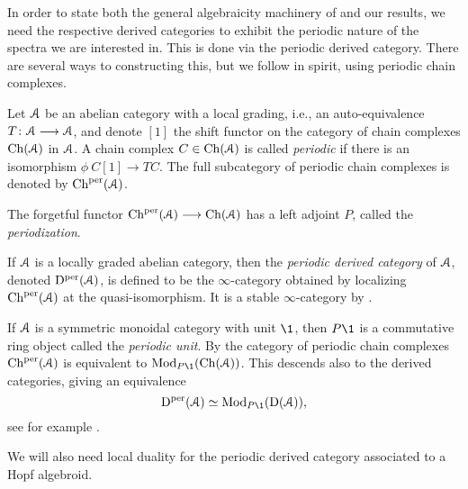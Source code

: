 In order to state both the general algebraicity machinery of \cite{patchkoria-pstragowski_2021} and our results, we need the respective derived categories to exhibit the periodic nature of the spectra we are interested in. This is done via the periodic derived category. There are several ways to constructing this, but we follow \cite{franke_96} in spirit, using periodic chain complexes. 

\begin{definition}
    \label{ch1:def:periodic-chain-complex}
    Let $\EuScript{A}$ be an abelian category with a local grading, i.e., an auto-equivalence $T\colon \EuScript{A}\longrightarrow\EuScript{A}$, and denote $[1]$ the shift functor on the category of chain complexes $\mathrm{Ch}(\EuScript{A})$ in $\EuScript{A}$. A chain complex $C\in \mathrm{Ch}(\EuScript{A})$ is called \emph{periodic} if there is an isomorphism $\phi\: C[1]\longrightarrow TC$. The full subcategory of periodic chain complexes is denoted by $\mathrm{Ch}^{\mathrm{per}}(\EuScript{A})$. 
\end{definition}

\begin{definition}
    The forgetful functor $\mathrm{Ch}^{\mathrm{per}}(\EuScript{A})\longrightarrow \mathrm{Ch}(\EuScript{A})$ has a left adjoint $P$, called the \emph{periodization}. 
\end{definition}

\begin{definition}
    \label{ch1:def:periodic-derived-category}
    If $\EuScript{A}$ is a locally graded abelian category, then the \emph{periodic derived category} of $\EuScript{A}$, denoted $\mathrm{D}^{\mathrm{per}}(\EuScript{A})$, is defined to be the $\infty$-category obtained by localizing $\mathrm{Ch}^{\mathrm{per}}(\EuScript{A})$ at the quasi-isomorphism. It is a stable $\infty$-category by \cite[7.8]{patchkoria-pstragowski_2021}. 
\end{definition}

\begin{remark}
    \label{ch1:rm:periodic-derived-as-modules}
    If $\EuScript{A}$ is a symmetric monoidal category with unit $\1$, then $P\1$ is a commutative ring object called the \emph{periodic unit}. By \cite[2.3]{barnes-roitzheim_2011} the category of periodic chain complexes $\mathrm{Ch}^{\mathrm{per}}(\EuScript{A})$ is equivalent to $\Mod_{P\1}(\Ch(\A))$. This descends also to the derived categories, giving an equivalence 
    \[\Dper(\A)\simeq \Mod_{P\1}(\Der(\A)),\]
    see for example \cite[3.7]{pstragowski_2021}. 
\end{remark}

We will also need local duality  for the periodic derived category associated to a Hopf algebroid. 

